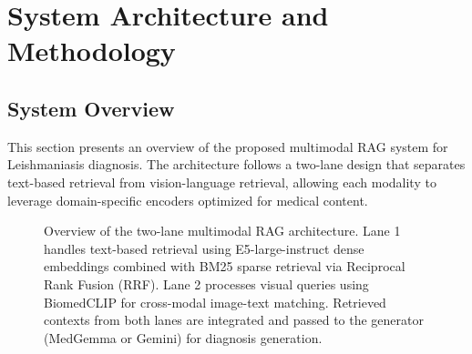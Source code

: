 \chapter{System Architecture and Methodology}
\label{ch:methodology}

%
%
\section{System Overview}
\label{sec:methodology:overview}


This section presents an overview of the proposed multimodal RAG system for Leishmaniasis diagnosis. The architecture follows a two-lane design that separates text-based retrieval from vision-language retrieval, allowing each modality to leverage domain-specific encoders optimized for medical content.

\begin{figure}[htbp]
  \centering
  \caption[Two-Lane RAG Architecture]{Overview of the two-lane multimodal RAG architecture. Lane 1 handles text-based retrieval using E5-large-instruct dense embeddings combined with BM25 sparse retrieval via Reciprocal Rank Fusion (RRF). Lane 2 processes visual queries using BiomedCLIP for cross-modal image-text matching. Retrieved contexts from both lanes are integrated and passed to the generator (MedGemma or Gemini) for diagnosis generation.}
  \label{fig:methodology:architecture}
\end{figure}

